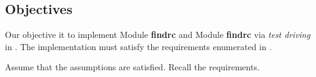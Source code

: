 \documentclass[12pt, titlepage]{article}
\begin{document}
%  

\subsection{Objectives}

Our objective it to implement Module {\bf findrc} and Module {\bf findrc} via
{\it test driving} in \cpp. The implementation must satisfy the requirements
enumerated in \cite{SRS}.

Assume that the assumptions are satisfied. Recall the requirements.

%  
%  
%  
%  
%  
%  
%  
%  
\end{document}

